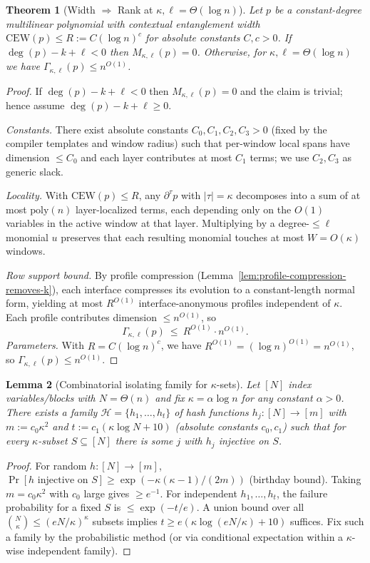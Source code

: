 \documentclass[12pt]{article}
\newtheorem{theorem}{Theorem}
\newtheorem{lemma}[theorem]{Lemma}
\theoremstyle{definition}
\theoremstyle{definition}
\theoremstyle{remark}
\theoremstyle{remark}
\begin{document}
\begin{theorem}[Width $\Rightarrow$ Rank at $\kappa,\ell=\Theta(\log n)$]\label{thm:width-to-rank-appg}
Let $p$ be a constant-degree multilinear polynomial with contextual entanglement width $\mathrm{CEW}(p)\le R:=C(\log n)^c$ for absolute constants $C,c>0$.
If $\deg(p)-k+\ell<0$ then $M_{\kappa,\ell}(p)=0$. Otherwise, for $\kappa,\ell=\Theta(\log n)$ we have $\Gamma_{\kappa,\ell}(p)\le n^{O(1)}$.
\end{theorem}
\begin{proof}
If $\deg(p)-k+\ell<0$ then $M_{\kappa,\ell}(p)=0$ and the claim is trivial; hence assume $\deg(p)-k+\ell\ge 0$.

\noindent\emph{Constants.} There exist absolute constants $C_0,C_1,C_2,C_3>0$ (fixed by the compiler templates and window radius) such that per-window local spans have
dimension $\le C_0$ and each layer contributes at most $C_1$ terms; we use $C_2,C_3$ as generic slack.

\emph{Locality.} With $\mathrm{CEW}(p)\le R$, any $\partial^\tau p$ with $|\tau|=\kappa$ decomposes into a sum of at most $\mathrm{poly}(n)$ layer-localized terms, each depending only on the
$O(1)$ variables in the active window at that layer. Multiplying by a degree-$\le \ell$ monomial $u$ preserves that each resulting monomial touches at most $W=O(\kappa)$ windows.

\emph{Row support bound.} By profile compression
(Lemma~\ref{lem:profile-compression-removes-k}), each interface compresses its
evolution to a constant-length normal form, yielding at most $R^{O(1)}$
interface-anonymous profiles independent of $\kappa$. Each profile contributes
dimension $\le n^{O(1)}$, so
\[
\Gamma_{\kappa,\ell}(p)\ \le\ R^{O(1)}\cdot n^{O(1)}.
\]
\emph{Parameters.} With $R=C(\log n)^c$, we have
$R^{O(1)}=(\log n)^{O(1)}=n^{O(1)}$, so $\Gamma_{\kappa,\ell}(p)\le n^{O(1)}$.
\end{proof}

\begin{lemma}[Combinatorial isolating family for $\kappa$-sets]\label{lem:splitter-appg}
Let $[N]$ index variables/blocks with $N=\Theta(n)$ and fix $\kappa=\alpha\log n$ for any constant $\alpha>0$.
There exists a family $\mathcal{H}=\{h_1,\ldots,h_t\}$ of hash functions $h_j:[N]\to[m]$ with $m:=c_0 \kappa^2$ and $t:=c_1(\kappa\log N+10)$ (absolute constants $c_0,c_1$)
such that for every $\kappa$-subset $S\subseteq[N]$ there is some $j$ with $h_j$ injective on $S$.
\end{lemma}
\begin{proof}
For random $h:[N]\to[m]$, $\Pr[h\text{ injective on }S]\ge \exp(-\kappa(\kappa-1)/(2m))$ (birthday bound). Taking $m=c_0\kappa^2$ with $c_0$ large gives $\ge e^{-1}$.
For independent $h_1,\ldots,h_t$, the failure probability for a fixed $S$ is $\le \exp(-t/e)$. A union bound over all $\binom{N}{\kappa}\le (eN/\kappa)^\kappa$ subsets implies
$t\ge e(\kappa\log(eN/\kappa)+10)$ suffices. Fix such a family by the probabilistic method (or via conditional expectation within a $\kappa$-wise independent family).
\end{proof}
\end{document}
